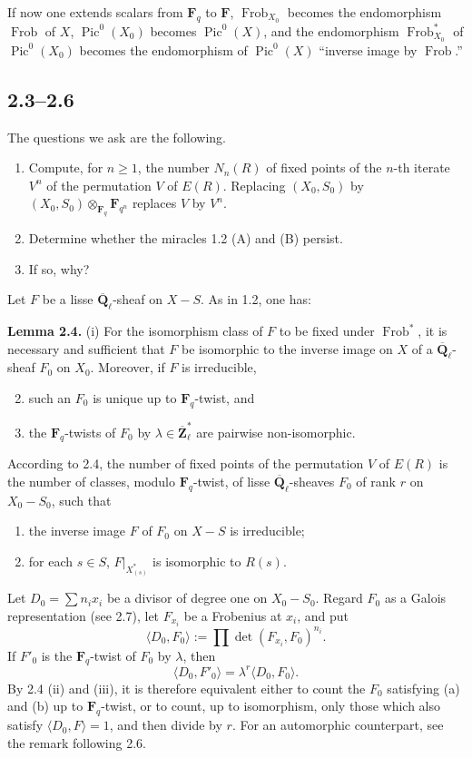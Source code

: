 \documentclass[11pt]{article}
\newcommand{\Qbar}{\overline{\mathbf Q}}
\newcommand{\Fq}{\mathbf F_q}
\newcommand{\F}{\mathbf F}
\newcommand{\Frob}{\operatorname{Frob}}
\newcommand{\Pic}{\operatorname{Pic}}
\begin{document}
If now one extends scalars from \(\Fq\) to \(\F\), \(\Frob_{X_0}\) becomes the endomorphism \(\Frob\) of \(X\), \(\Pic^0(X_0)\) becomes \(\Pic^0(X)\), and the endomorphism \(\Frob_{X_0}^*\) of \(\Pic^0(X_0)\) becomes the endomorphism of \(\Pic^0(X)\) ``inverse image by \(\Frob\).''

\subsection{2.3--2.6}
The questions we ask are the following.
\begin{enumerate}[label=(\roman*)]
\item Compute, for \(n\ge 1\), the number \(N_n(R)\) of fixed points of the \(n\)-th iterate \(V^n\) of the permutation \(V\) of \(E(R)\). Replacing \((X_0,S_0)\) by \((X_0,S_0)\otimes_{\Fq}\mathbf F_{q^n}\) replaces \(V\) by \(V^n\).
\item Determine whether the miracles 1.2 (A) and (B) persist.
\item If so, why?
\end{enumerate}
Let \(F\) be a lisse \(\Qbar_\ell\)-sheaf on \(X-S\). As in 1.2, one has:

\textbf{Lemma 2.4.} (i) For the isomorphism class of \(F\) to be fixed under \(\Frob^*\), it is necessary and sufficient that \(F\) be isomorphic to the inverse image on \(X\) of a \(\Qbar_\ell\)-sheaf \(F_0\) on \(X_0\). Moreover, if \(F\) is irreducible,
\begin{enumerate}[label=(\roman*)]
\setcounter{enumi}{1}
\item such an \(F_0\) is unique up to \(\Fq\)-twist, and
\item the \(\Fq\)-twists of \(F_0\) by \(\lambda\in\overline{\mathbf Z}_\ell^*\) are pairwise non-isomorphic.
\end{enumerate}
According to 2.4, the number of fixed points of the permutation \(V\) of \(E(R)\) is the number of classes, modulo \(\Fq\)-twist, of lisse \(\Qbar_\ell\)-sheaves \(F_0\) of rank \(r\) on \(X_0-S_0\), such that
\begin{enumerate}[label=(\alph*)]
\item the inverse image \(F\) of \(F_0\) on \(X-S\) is irreducible;
\item for each \(s\in S\), \(F|_{X^*_{(s)}}\) is isomorphic to \(R(s)\).
\end{enumerate}
Let \(D_0=\sum n_i x_i\) be a divisor of degree one on \(X_0-S_0\). Regard \(F_0\) as a Galois representation (see 2.7), let \(F_{x_i}\) be a Frobenius at \(x_i\), and put
\[
\langle D_0,F_0\rangle:=\prod \det(F_{x_i},F_0)^{n_i}.
\]
If \(F'_0\) is the \(\Fq\)-twist of \(F_0\) by \(\lambda\), then
\[
\langle D_0,F'_0\rangle=\lambda^r\langle D_0,F_0\rangle.
\]
By 2.4 (ii) and (iii), it is therefore equivalent either to count the \(F_0\) satisfying (a) and (b) up to \(\Fq\)-twist, or to count, up to isomorphism, only those which also satisfy \(\langle D_0,F\rangle=1\), and then divide by \(r\). For an automorphic counterpart, see the remark following 2.6.
\end{document}
